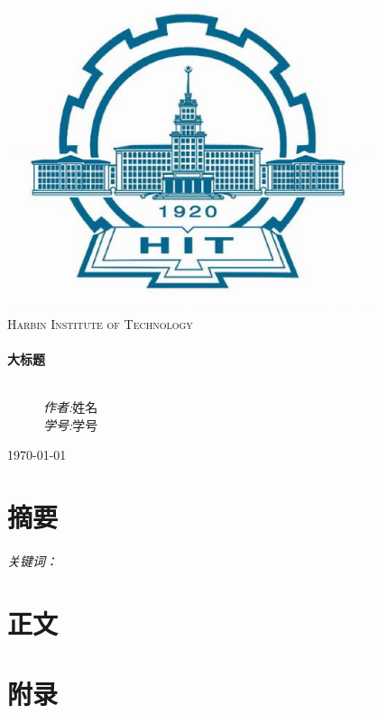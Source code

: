 \documentclass[a4paper,11pt]{ctexart}
\begin{document}
\begin{titlepage}
\begin{center}

\includegraphics[width=0.8\textwidth]{./images/HIT.eps}\\[1cm]
\textsc{\LARGE Harbin Institute of Technology}\\[1.5cm]

\hrulefill \\[0.4cm]
{ \huge \bfseries 大标题}\\[0.4cm]
\hrulefill \\[1.5cm]

\begin{figure}[htb]
    \begin{minipage}[b]{0.5\textwidth}
    \begin{flushleft} \large%

    \end{flushleft}
    \label{fig:left}
  \end{minipage}%
  \begin{minipage}[b]{0.5\textwidth}
    \centering
    \begin{flushright} \large%
    \emph{作者:}姓名\\
    \emph{学号:}学号
    \end{flushright}
    \label{fig:right}
  \end{minipage}
\end{figure}

\vfill
{\large \today}%
\end{center}
\end{titlepage}

\part*{摘要}
\paragraph{关键词：}

\tableofcontents            %
\newpage

\part{正文}

\newpage
\appendix
\part{附录}
\end{document}
